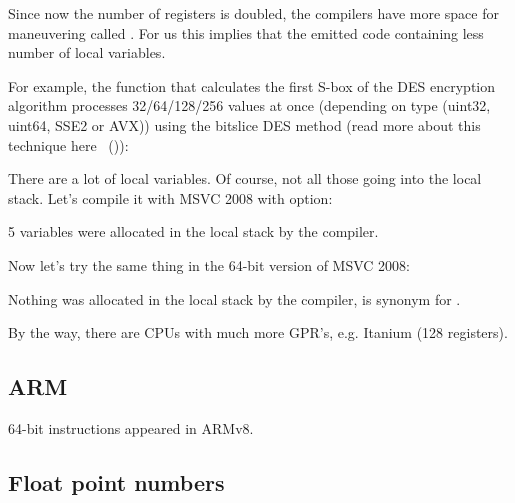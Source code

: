
Since now the number of registers is doubled, the compilers have more space for maneuvering called 
.
For us this implies that the emitted code containing less number of local variables.


For example, the function that calculates the first S-box of the DES encryption algorithm processes
32/64/128/256 values at once (depending on  type (uint32, uint64, SSE2 or AVX)) 
using the bitslice DES method
(read more about this technique here ~()):



There are a lot of local variables. 
Of course, not all those going into the local stack.
Let's compile it with MSVC 2008 with  option:



5 variables were allocated in the local stack by the compiler.

Now let's try the same thing in the 64-bit version of MSVC 2008:



Nothing was allocated in the local stack by the compiler,  is synonym for .

\iffalse

By the way, we can see here that the function saved the \RCX and \RDX registers in space allocated by the \gls{caller},
but \Reg{8} and \Reg{9} were not saved but used from the beginning.
\fi

By the way, there are CPUs with much more \ac{GPR}'s, e.g. Itanium (128 registers).

\subsection{ARM}

64-bit instructions appeared in ARMv8.

\subsection{Float point numbers}

